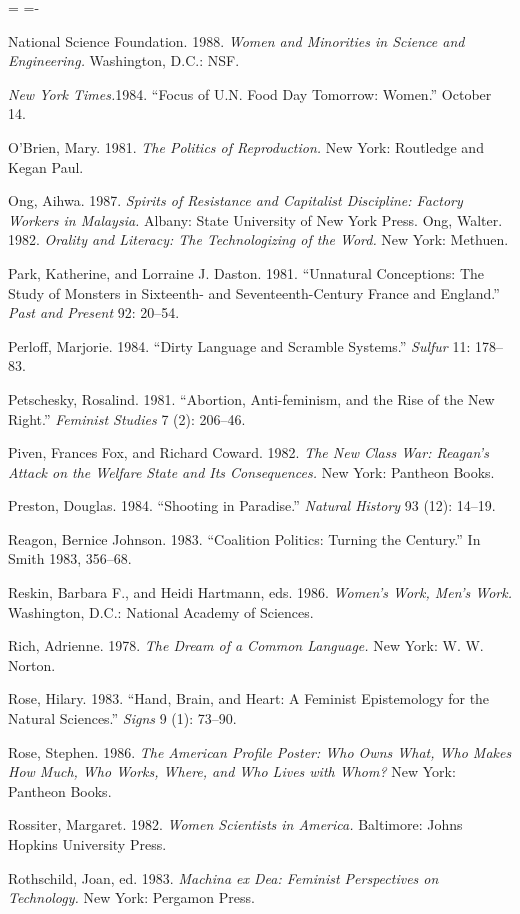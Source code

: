 \documentclass[DIV=12,%
               BCOR=10mm,%
               headinclude=false,%
               footinclude=false,open=any,%
               fontsize=11pt,%
               twoside,%
               paper=210mm:11in]%
               {scrbook}
\newenvironment*{amusebiblio}{
  \leftskip=\parindent
  \parindent=-\parindent
  \smallskip
  \indent
}{\smallskip}
\begin{document}
\begin{amusebiblio}
National Science Foundation. 1988. \emph{Women and Minorities in Science and Engineering.} Washington, D.C.: NSF.


\emph{New York Times.}1984. “Focus of U.N. Food Day Tomorrow: Women.” October 14.


O’Brien, Mary. 1981. \emph{The Politics of Reproduction.} New York: Routledge and Kegan Paul.


Ong, Aihwa. 1987. \emph{Spirits of Resistance and Capitalist Discipline: Factory Workers in Malaysia.} Albany: State University of New York Press. Ong, Walter. 1982. \emph{Orality and Literacy: The Technologizing of the Word.} New York: Methuen.


Park, Katherine, and Lorraine J. Daston. 1981. “Unnatural Conceptions: The Study of Monsters in Sixteenth- and Seventeenth-Century France and England.” \emph{Past and Present} 92: 20–54.


Perloff, Marjorie. 1984. “Dirty Language and Scramble Systems.” \emph{Sulfur} 11: 178–83.


Petschesky, Rosalind. 1981. “Abortion, Anti-feminism, and the Rise of the New Right.” \emph{Feminist Studies} 7 (2): 206–46.


Piven, Frances Fox, and Richard Coward. 1982. \emph{The New Class War: Reagan’s Attack on the Welfare State and Its Consequences.} New York: Pantheon Books.


Preston, Douglas. 1984. “Shooting in Paradise.” \emph{Natural History} 93 (12): 14–19.


Reagon, Bernice Johnson. 1983. “Coalition Politics: Turning the Century.” In Smith 1983, 356–68.


Reskin, Barbara F., and Heidi Hartmann, eds. 1986. \emph{Women’s Work, Men’s Work.} Washington, D.C.: National Academy of Sciences.


Rich, Adrienne. 1978. \emph{The Dream of a Common Language.} New York: W. W. Norton.


Rose, Hilary. 1983. “Hand, Brain, and Heart: A Feminist Epistemology for the Natural Sciences.” \emph{Signs} 9 (1): 73–90.


Rose, Stephen. 1986. \emph{The American Profile Poster: Who Owns What, Who Makes How Much, Who Works, Where, and Who Lives with Whom?} New York: Pantheon Books.


Rossiter, Margaret. 1982. \emph{Women Scientists in America.} Baltimore: Johns Hopkins University Press.


Rothschild, Joan, ed. 1983. \emph{Machina ex Dea: Feminist Perspectives on Technology.} New York: Pergamon Press.



\end{amusebiblio}
\end{document}
